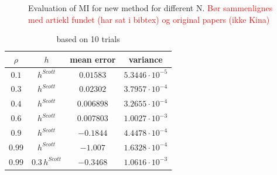 \documentclass[../Thesis.tex]{subfiles}
\begin{document}
\begin{figure}[H]
\begin{subfigure}[t]{0.49\textwidth}
        \caption{}
        \label{subfig:new MI method all zoom}
    \end{subfigure}
    \caption{Evaluation of MI for new method for different N. \textcolor{red}{Bør sammenlignes med artiekl fundet (har sat i bibtex) og original papers (ikke Kina)}}
    \label{fig:approximation of mutual information knowing the true distribution}
\end{figure}


\begin{table}[ht]
    \centering
    \begin{tabular}{c|c|c|c}
        $\rho$ & $h$              & mean error  & variance                 \\\hline
        $0.1$  & $h^{Scott}$      & $ 0.01583$  & $5.3446 \cdot 10^{-5}$   \\
        $0.3$  & $h^{Scott}$      & $ 0.02302$  & $3.7957 \cdot 10^{-4}$   \\
        $0.4$  & $h^{Scott}$      & $ 0.006898$ & $3.2655  \cdot 10^{-4}$  \\
        $0.6$  & $h^{Scott}$      & $ 0.007803$ & $1.0027  \cdot 10^{-3}$  \\
        $0.9$  & $h^{Scott}$      & $-0.1844$   & $4.4478  \cdot 10^{-4} $ \\
        $0.99$ & $h^{Scott}$      & $-1.007$    & $1.6328  \cdot 10^{-4}$  \\
        $0.99$ & $0.3\,h^{Scott}$ & $-0.3468$   & $1.0616  \cdot 10^{-3}$
    \end{tabular}
    \caption{based on 10 trials}
    \label{tab:Jones error and variance}
\end{table}







\end{document}
